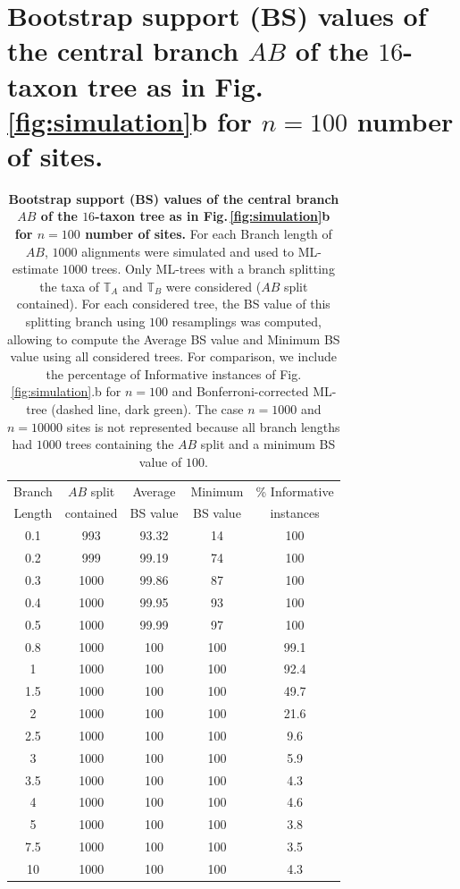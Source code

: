 \section{Bootstrap support (BS) values of the central branch $AB$ of the $16$-taxon tree as in Fig.\,\ref{fig:simulation}b for $n =100$ number of sites.}

\begin{table}[hb]
    \centering
    \begin{tabular}{|c|c|c|c|c|}
\hline
Branch & $AB$ split & Average  & Minimum & \% Informative\\
Length & contained   & BS value & BS value & instances \\
\hline
0.1 &  993 &  93.32 &  14 & 100   \\
0.2 &  999 &  99.19 &  74 & 100   \\
0.3 & 1000 &  99.86 &  87 & 100   \\
0.4 & 1000 &  99.95 &  93 & 100   \\
0.5 & 1000 &  99.99 &  97 & 100   \\
0.8 & 1000 & 100    & 100 &  99.1 \\
1   & 1000 & 100    & 100 &  92.4 \\
1.5 & 1000 & 100    & 100 &  49.7 \\
2   & 1000 & 100    & 100 &  21.6 \\
2.5 & 1000 & 100    & 100 &   9.6 \\
3   & 1000 & 100    & 100 &   5.9 \\
3.5 & 1000 & 100    & 100 &   4.3 \\
4   & 1000 & 100    & 100 &   4.6 \\
5   & 1000 & 100    & 100 &   3.8 \\
7.5 & 1000 & 100    & 100 &   3.5 \\
10  & 1000 & 100    & 100 &   4.3 \\
\hline
    \end{tabular}
    \vspace{0.25cm}
    \caption{
\textbf{Bootstrap support (BS) values of the central branch $AB$ of the $16$-taxon tree as in Fig.\,\ref{fig:simulation}b for $n =100$ number of sites.} For each Branch length of $AB$, $1000$ alignments were simulated and used to ML-estimate $1000$ trees. Only ML-trees with a branch splitting the taxa of $\mathbb{T}_A$ and $\mathbb{T}_B$ were considered ($AB$ split contained). For each considered tree, the BS value of this splitting branch using $100$ resamplings was computed, allowing to compute the Average BS value and Minimum BS value using all considered trees. For comparison, we include the percentage of Informative instances of Fig. \ref{fig:simulation}.b for $n=100$ and Bonferroni-corrected ML-tree (dashed line, {\color{britishracinggreen} dark green}). The case $n=1000$ and $n=10000$ sites is not represented because all branch lengths had $1000$ trees containing the $AB$ split and a minimum BS value of $100$.
    }
    \label{tab:bootstrap}
    \end{table}

